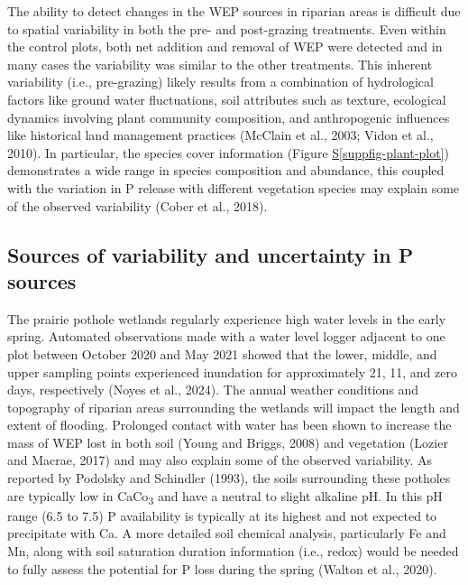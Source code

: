\documentclass[
]{agujournal2019}
\newcommand*\quartosuppfigref[1]{Figure \hyperref[#1]{S\ref{#1}}}
\begin{document}
The ability to detect changes in the WEP sources in riparian areas is
difficult due to spatial variability in both the pre- and post-grazing
treatments. Even within the control plots, both net addition and removal
of WEP were detected and in many cases the variability was similar to
the other treatments. This inherent variability (i.e., pre-grazing)
likely results from a combination of hydrological factors like ground
water fluctuations, soil attributes such as texture, ecological dynamics
involving plant community composition, and anthropogenic influences like
historical land management practices (McClain et al., 2003; Vidon et
al., 2010). In particular, the species cover information
(\quartosuppfigref{suppfig-plant-plot}) demonstrates a wide range in
species composition and abundance, this coupled with the variation in P
release with different vegetation species may explain some of the
observed variability (Cober et al., 2018).

\subsection{Sources of variability and uncertainty in P
sources}\label{sources-of-variability-and-uncertainty-in-p-sources}

The prairie pothole wetlands regularly experience high water levels in
the early spring. Automated observations made with a water level logger
adjacent to one plot between October 2020 and May 2021 showed that the
lower, middle, and upper sampling points experienced inundation for
approximately 21, 11, and zero days, respectively (Noyes et al., 2024).
The annual weather conditions and topography of riparian areas
surrounding the wetlands will impact the length and extent of flooding.
Prolonged contact with water has been shown to increase the mass of WEP
lost in both soil (Young and Briggs, 2008) and vegetation (Lozier and
Macrae, 2017) and may also explain some of the observed variability. As
reported by Podolsky and Schindler (1993), the soils surrounding these
potholes are typically low in CaCo\textsubscript{3} and have a neutral
to slight alkaline pH. In this pH range (6.5 to 7.5) P availability is
typically at its highest and not expected to precipitate with Ca. A more
detailed soil chemical analysis, particularly Fe and Mn, along with soil
saturation duration information (i.e., redox) would be needed to fully
assess the potential for P loss during the spring (Walton et al., 2020).
\end{document}
